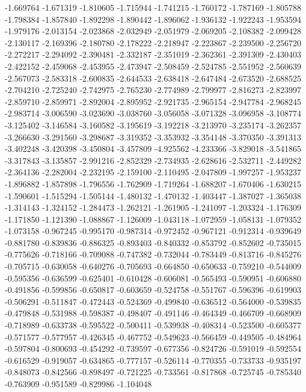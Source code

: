-1.669764
-1.671319
-1.810605
-1.715944
-1.741215
-1.760172
-1.787169
-1.805788
-1.798384
-1.857840
-1.892298
-1.890442
-1.896062
-1.936132
-1.922243
-1.953594
-1.979176
-2.013154
-2.023868
-2.032949
-2.051979
-2.069205
-2.108382
-2.099428
-2.130117
-2.169396
-2.180780
-2.178222
-2.218947
-2.223867
-2.239500
-2.256720
-2.272217
-2.294092
-2.390481
-2.332187
-2.351019
-2.362361
-2.391309
-2.430403
-2.422152
-2.459068
-2.453955
-2.473947
-2.508459
-2.524785
-2.551952
-2.560639
-2.567073
-2.583318
-2.600835
-2.644533
-2.638418
-2.647484
-2.673520
-2.688525
-2.704210
-2.725240
-2.742975
-2.765230
-2.774989
-2.799977
-2.816273
-2.823997
-2.859710
-2.859971
-2.892004
-2.895952
-2.921735
-2.965154
-2.947784
-2.968245
-2.983714
-3.006590
-3.023690
-3.038760
-3.056058
-3.071328
-3.096958
-3.108774
-3.125402
-3.146584
-3.160582
-3.195619
-3.192218
-3.213970
-3.235174
-3.262357
-3.266630
-3.291560
-3.298687
-3.319352
-3.353932
-3.354148
-3.370350
-3.391313
-3.402248
-3.420398
-3.450804
-3.457809
-4.925562
-4.233366
-3.829018
-3.541865
-3.317843
-3.135857
-2.991216
-2.852329
-2.734935
-2.628616
-2.532711
-2.449282
-2.364136
-2.282004
-2.232195
-2.159100
-2.110495
-2.047809
-1.997257
-1.953237
-1.896882
-1.857898
-1.796556
-1.762909
-1.719264
-1.688207
-1.670406
-1.630215
-1.590601
-1.515294
-1.505144
-1.480132
-1.470132
-1.403447
-1.387027
-1.365038
-1.314143
-1.324152
-1.284473
-1.262121
-1.261905
-1.241097
-1.203324
-1.176309
-1.171850
-1.121390
-1.088867
-1.126009
-1.043118
-1.072959
-1.058131
-1.079352
-1.073158
-0.967245
-0.995170
-0.987314
-0.972452
-0.967121
-0.912314
-0.939649
-0.881780
-0.839836
-0.886325
-0.893403
-0.840332
-0.853792
-0.852602
-0.735015
-0.775626
-0.718166
-0.709088
-0.747382
-0.732044
-0.783449
-0.813716
-0.845276
-0.705715
-0.630058
-0.640276
-0.705693
-0.664850
-0.650633
-0.759210
-0.544009
-0.595356
-0.636599
-0.625401
-0.610428
-0.606081
-0.565493
-0.590951
-0.606880
-0.491856
-0.599856
-0.650817
-0.603659
-0.524758
-0.551767
-0.596396
-0.619903
-0.506291
-0.511847
-0.472443
-0.524369
-0.499840
-0.636512
-0.564000
-0.539835
-0.479848
-0.531988
-0.598387
-0.498407
-0.491146
-0.464349
-0.466709
-0.668909
-0.718989
-0.633738
-0.595522
-0.500411
-0.539938
-0.408314
-0.523500
-0.605377
-0.571577
-0.577957
-0.426345
-0.467752
-0.549623
-0.566459
-0.449505
-0.484964
-0.597804
-0.800693
-0.454292
-0.739597
-0.677356
-0.824726
-0.591019
-0.592554
-0.616529
-0.919057
-0.634865
-0.777157
-0.526114
-0.770355
-0.733733
-0.935197
-0.848073
-0.842566
-0.898497
-0.721225
-0.733561
-0.817868
-0.725745
-0.785340
-0.763909
-0.951589
-0.829986
-1.104048
